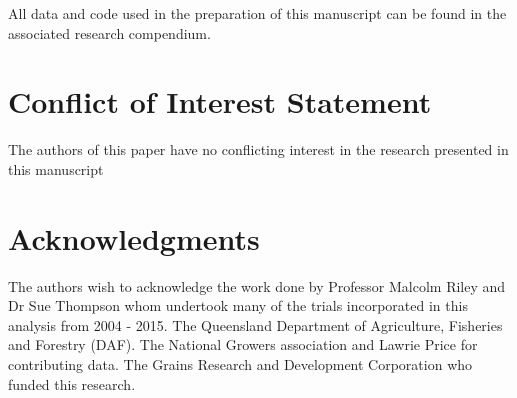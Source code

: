 \documentclass[agronomy,article,submit,moreauthors,pdftex]{mdpi}
\begin{document}
All data and code used in the preparation of this manuscript can be found in the associated research compendium.

\hypertarget{conflict-of-interest-statement}{%
\section{Conflict of Interest Statement}\label{conflict-of-interest-statement}}

The authors of this paper have no conflicting interest in the research presented in this manuscript

\hypertarget{acknowledgments}{%
\section{Acknowledgments}\label{acknowledgments}}

The authors wish to acknowledge the work done by Professor Malcolm Riley and Dr Sue Thompson whom undertook many of the trials incorporated in this analysis from 2004 - 2015.
The Queensland Department of Agriculture, Fisheries and Forestry (DAF).
The National Growers association and Lawrie Price for contributing data.
The Grains Research and Development Corporation who funded this research.

%

\vspace{6pt}


\end{document}
